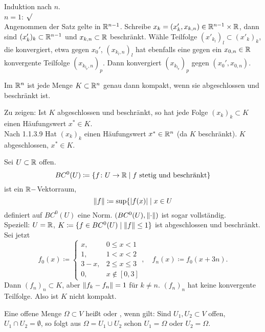 \newpage
\begin{beweis}
	Induktion nach $ n $.\\
    $ n=1 $: $ \surd $\\
	Angenommen der Satz gelte in $ \mathbb{R}^{n-1} $. Schreibe $ x_k=(x_k', x_{k,n})\in\mathbb{R}^{n-1}\times\mathbb{R} $,  dann sind $ (x'_k)_k\subset\mathbb{R}^{n-1} $ und $ x_{k,n}\subset\mathbb{R} $ beschr\"ankt. W\"ahle Teilfolge $ (x'_{k_l})_l\subset(x'_k)_k $, die konvergiert, etwa gegen $ x_0' $, $ (x_{k_l,n})_l $ hat ebenfalls eine gegen ein $ x_{0,n}\in\mathbb{R} $ konvergente Teilfolge $ (x_{k_{l_p},n})_p $. Dann konvergiert $ (x_{k_{l_p}})_p $ gegen $ (x_0', x_{0,n}). $ 
\end{beweis}
\begin{satz}
	Im $ \mathbb{R}^n $ ist jede Menge $ K\subset\mathbb{R}^n $ genau dann kompakt, wenn sie abgeschlossen und beschr\"ankt ist.
\end{satz}
\begin{beweis}
	Zu zeigen: Ist $ K $ abgeschlossen und beschr\"ankt, so hat jede Folge $ (x_k)_k\subset K $ einen H\"aufungswert $ x^\ast\in K $.\\
	Nach 1.1.3.9 Hat $ (x_k)_k $ einen H\"aufungswert $ x^\ast\in\mathbb{R}^n $ (da $ K $ beschr\"ankt). $ K $ abgeschlossen, $ x^\ast\in K $.
\end{beweis}
\begin{beispiel*}
	Sei $ U\subset\mathbb{R} $ offen.
	\[ BC^0(U)\coloneqq\lbrace f\colon U\rightarrow\mathbb{R}\mid f\text{ stetig und beschr\"ankt}\rbrace \]
	ist ein $ \mathbb{R}- $Vektorraum,
	\[ \left\|f\right\|\coloneqq\sup\lbrace |f(x)|\mid x\in U \]
	definiert auf $ BC^0(U) $ eine Norm. $ (BC^0(U),\left\|\cdot\right\|) $ ist sogar vollst\"andig.\\
	Speziell: $ U=\mathbb{R} $, $ K\coloneqq\lbrace f\in BC^0(U)\mid \left\|f\right\|\leq 1\rbrace $ ist abgeschlossen und beschr\"ankt.\\
	Sei jetzt
	\[ f_0(x)\coloneqq \begin{cases}
	x,&0\leq x<1\\
	1,&1<x<2\\
	3-x,&2\leq x\leq 3\\
	0,& x\notin[0,3]
	\end{cases},\quad f_n(x)\coloneqq f_0(x+3n). \]
	Dann $ (f_n)_n\subset K $, aber $ \left\|f_k-f_n\right\|=1 $ f\"ur $ k\neq n $. $ (f_n)_n $ hat keine konvergente Teilfolge. Also ist $ K $ nicht kompakt.
\end{beispiel*}
\newpage
\begin{definition}
	Eine offene Menge $ \Omega\subset V $ hei\ss t  oder , wenn gilt: Sind $ U_1, U_2\subset V $ offen, $ U_1\cap U_2=\emptyset $, so folgt aus $ \Omega=U_1\cup U_2 $ schon $ U_1=\Omega $ oder $ U_2=\Omega $.
\end{definition}
